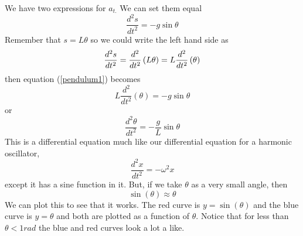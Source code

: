 \documentclass{book}
\begin{document}
We have two expressions for $a_{t.}$ We can set them equal 
\begin{equation}
\frac{d^{2}s}{dt^{2}}=-g\sin \theta  \label{pendulum1}
\end{equation}%
Remember that $s=L\theta $ so we could write the left hand side as%
\begin{equation*}
\frac{d^{2}s}{dt^{2}}=\frac{d^{2}}{dt^{2}}\left( L\theta \right) =L\frac{%
d^{2}}{dt^{2}}\left( \theta \right)
\end{equation*}%
then equation (\ref{pendulum1}) becomes%
\begin{equation*}
L\frac{d^{2}}{dt^{2}}\left( \theta \right) =-g\sin \theta
\end{equation*}%
or 
\begin{equation*}
\frac{d^{2}\theta }{dt^{2}}=-\frac{g}{L}\sin \theta
\end{equation*}%
This is a differential equation much like our differential equation for a
harmonic oscillator, 
\begin{equation*}
\frac{d^{2}x}{dt^{2}}=-\omega ^{2}x
\end{equation*}%
except it has a sine function in it. But, if we take $\theta $ as a very
small angle, then 
\begin{equation}
\sin \left( \theta \right) \approx \theta  \label{small angle approximation}
\end{equation}%
We can plot this to see that it works. The red curve is $y=\sin \left(
\theta \right) $ and the blue curve is $y=\theta $ and both are plotted as a
function of $\theta .$ Notice that for less than $\theta <1\unit{rad}$ the
blue and red curves look a lot a like.
\end{document}
